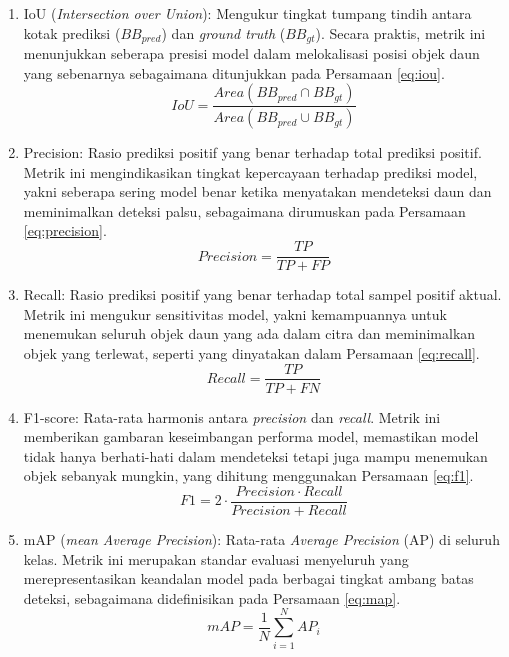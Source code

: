 \begin{enumerate}[nosep]
    \item IoU (\textit{Intersection over Union}): Mengukur tingkat tumpang tindih antara kotak prediksi ($BB_{pred}$) dan \textit{ground truth} ($BB_{gt}$). Secara praktis, metrik ini menunjukkan seberapa presisi model dalam melokalisasi posisi objek daun yang sebenarnya sebagaimana ditunjukkan pada Persamaan \ref{eq:iou}.
    \begin{equation}
        IoU = \frac{Area(BB_{pred} \cap BB_{gt})}{Area(BB_{pred} \cup BB_{gt})}
        \label{eq:iou}
    \end{equation}

    \item Precision: Rasio prediksi positif yang benar terhadap total prediksi positif. Metrik ini mengindikasikan tingkat kepercayaan terhadap prediksi model, yakni seberapa sering model benar ketika menyatakan mendeteksi daun dan meminimalkan deteksi palsu, sebagaimana dirumuskan pada Persamaan \ref{eq:precision}.
    \begin{equation}
        Precision = \frac{TP}{TP + FP}
        \label{eq:precision}
    \end{equation}

    \item Recall: Rasio prediksi positif yang benar terhadap total sampel positif aktual. Metrik ini mengukur sensitivitas model, yakni kemampuannya untuk menemukan seluruh objek daun yang ada dalam citra dan meminimalkan objek yang terlewat, seperti yang dinyatakan dalam Persamaan \ref{eq:recall}.
    \begin{equation}
        Recall = \frac{TP}{TP + FN}
        \label{eq:recall}
    \end{equation}

    \item F1-score: Rata-rata harmonis antara \textit{precision} dan \textit{recall}. Metrik ini memberikan gambaran keseimbangan performa model, memastikan model tidak hanya berhati-hati dalam mendeteksi tetapi juga mampu menemukan objek sebanyak mungkin, yang dihitung menggunakan Persamaan \ref{eq:f1}.
    \begin{equation}
        F1 = 2 \cdot \frac{Precision \cdot Recall}{Precision + Recall}
        \label{eq:f1}
    \end{equation}

    \item mAP (\textit{mean Average Precision}): Rata-rata \textit{Average Precision} (AP) di seluruh kelas. Metrik ini merupakan standar evaluasi menyeluruh yang merepresentasikan keandalan model pada berbagai tingkat ambang batas deteksi, sebagaimana didefinisikan pada Persamaan \ref{eq:map}.
    \begin{equation}
        mAP = \frac{1}{N} \sum_{i=1}^{N} AP_i
        \label{eq:map}
    \end{equation}
\end{enumerate}

